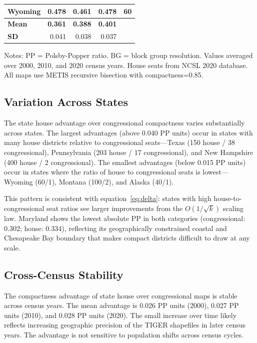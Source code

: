 \begin{table}[htbp]
\begin{threeparttable}
\begin{tabular}{lrrrr}
Wyoming      & 0.478 & 0.461 & 0.478 & 60  \\
\midrule
\textbf{Mean} & \textbf{0.361} & \textbf{0.388} & \textbf{0.401} & \\
\textbf{SD}   & 0.041 & 0.038 & 0.037 & \\
\bottomrule
\end{tabular}
\begin{tablenotes}
\small
\item Notes: PP = Polsby-Popper ratio. BG = block group resolution. Values averaged over 2000, 2010, and 2020 census years. House seats from NCSL 2020 database. All maps use METIS recursive bisection with compactness=0.85.
\end{tablenotes}
\end{threeparttable}
\end{table}

\subsection{Variation Across States}

The state house advantage over congressional compactness varies substantially across states. The largest advantages (above 0.040 PP units) occur in states with many house districts relative to congressional seats---Texas (150 house / 38 congressional), Pennsylvania (203 house / 17 congressional), and New Hampshire (400 house / 2 congressional). The smallest advantages (below 0.015 PP units) occur in states where the ratio of house to congressional seats is lowest---Wyoming (60/1), Montana (100/2), and Alaska (40/1).

This pattern is consistent with equation~\eqref{eq:delta}: states with high house-to-congressional seat ratios see larger improvements from the $O(1/\sqrt{k})$ scaling law. Maryland shows the lowest absolute PP in both categories (congressional: 0.302; house: 0.334), reflecting its geographically constrained coastal and Chesapeake Bay boundary that makes compact districts difficult to draw at any scale.

\subsection{Cross-Census Stability}

The compactness advantage of state house over congressional maps is stable across census years. The mean advantage is 0.026 PP units (2000), 0.027 PP units (2010), and 0.028 PP units (2020). The small increase over time likely reflects increasing geographic precision of the TIGER shapefiles in later census years. The advantage is not sensitive to population shifts across census cycles.

